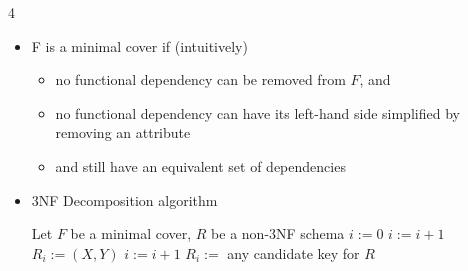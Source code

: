 \documentclass[8pt,landscape]{article}
\begin{document}
\begin{multicols*}{4}
\begin{itemize}[leftmargin=*]
    \item F is a minimal cover if (intuitively)
      \begin{itemize}
        \item no functional dependency can be removed from \(F\), and
        \item no functional dependency can have its left-hand side simplified by removing an attribute
        \item and still have an equivalent set of dependencies
\end{itemize}
\item 3NF Decomposition algorithm
\begin{center}
\begin{minipage}{\linewidth}
\begin{algorithmic}[1]
\State Let $F$ be a minimal cover, $R$ be a non-3NF schema
\State $i := 0$
        \State $i := i + 1$
        \State $R_i := (X, Y)$
    \EndIf
\EndFor
{}
    \State $i := i + 1$
    \State $R_i :=$ any candidate key for $R$
\EndIf
\end{algorithmic}
\end{minipage}
\end{center}
\end{itemize}

\end{multicols*}
\end{document}
